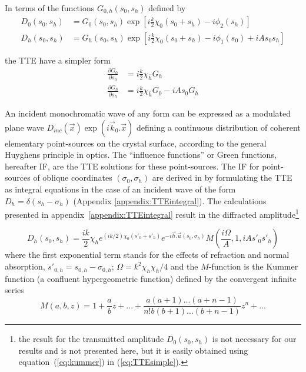 \documentclass[preprint]{iucr}              %
\newcommand{\inred}[1]{{\color{red}#1}}
\begin{document}
\inred{In terms of} the functions $G_{0,h}(s_0,s_h)$ defined by
  \begin{subequations}
    \label{eq:functionsG}
    \begin{align}
      D_0(s_0,s_h) &= G_0(s_0,s_h) \exp[i\frac{k}{2}\chi_0 (s_0+s_h)-i \phi_2(s_h)]\\
      D_h(s_0,s_h) &= G_h(s_0,s_h) \exp[i\frac{k}{2}\chi_0 (s_0+s_h)-i \phi_1(s_0)+iAs_0s_h]
    \end{align}
  \end{subequations}

the TTE have a simpler form
  \begin{subequations}
    \label{eq:TTEsimple}
    \begin{align}
      \frac{\partial G_0}{\partial s_0} &= i \frac{k}{2}\chi_{\bar{h}} G_h
      \\
      \frac{\partial G_h}{\partial s_h} &= i \frac{k}{2}\chi_{\bar{h}} G_0 - i A s_0 G_h
    \end{align}
  \end{subequations}

An incident monochromatic wave of any form can be expressed as a modulated plane wave $D_{inc}(\vec x)\exp(i \vec k_0 . \vec x)$ defining a continuous distribution of coherent elementary point-sources on the crystal surface, according to the general Huyghens principle in optics. The “influence functions” \inred{or Green functions}, hereafter IF, are the TTE solutions \inred{for} these point-sources. 
The IF for point-sources of oblique coordinates $(\sigma_0,\sigma_h)$
are derived in \cite{GuigayFerrero2016} by formulating the TTE  as integral equations in the case of an incident wave of the form \inred{$D_h=\delta(s_h-\sigma_h)$ (Appendix \ref{appendix:TTEintegral})}. 
The calculations presented in appendix~\ref{appendix:TTEintegral} result in the diffracted amplitude\footnote{the result for the transmitted amplitude $D_0(s_0,s_h)$ is not necessary for our results and is not presented here, but it is easily obtained using equation~(\ref{eq:kummer}) in (\ref{eq:TTEsimple}).}

  
\begin{equation}
\label{eq:kummer}
    D_h(s_0,s_h) = \frac{i k }{2} \chi_h e^{(ik/2) \chi_0 (s'_0 + s'_h)} e^{-i \vec h . \vec u (s_0,\sigma_h)} M(\frac{i\Omega}{A},1,iA s'_0 s'_h)
\end{equation}
where the first exponential term stands for the effects of refraction and normal absorption, $s'_{0,h}=s_{0,h}-\sigma_{0,h}$; $\Omega=k^2\chi_h\chi_{\bar{h}}/4$ and the $M$-function is the Kummer function (a confluent hypergeometric function) defined by the convergent infinite series
\begin{equation}
\label{eq:kummerSeries}
    M(a,b,z) = 1 + \frac{a}{b} z + 
    ... + \frac{a(a+1)...(a+n-1)}{n! b (b+1)...(b+n-1)}z^n+...
\end{equation}
\end{document}

